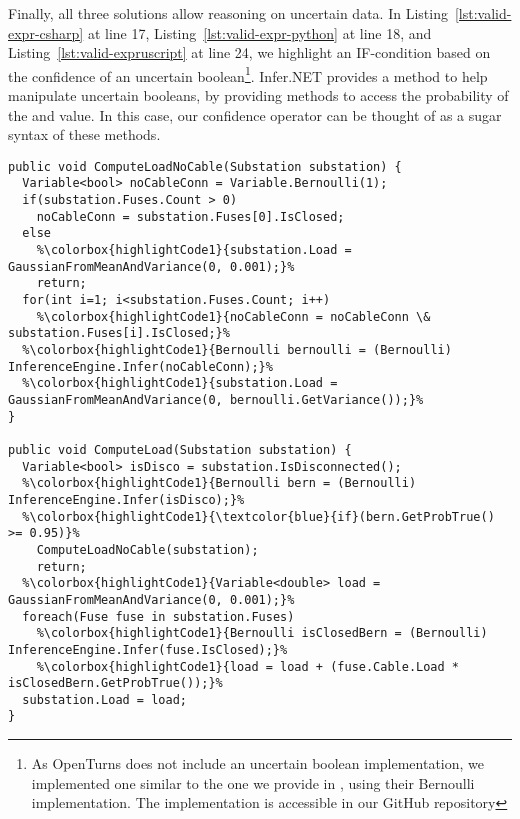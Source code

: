 Finally, all three solutions allow reasoning on uncertain data.
In Listing~\ref{lst:valid-expr-csharp} at line 17, Listing~\ref{lst:valid-expr-python} at line 18, and Listing~\ref{lst:valid-expruscript} at line 24, we highlight an IF-condition based on the confidence of an uncertain boolean\footnote{As OpenTurns does not include an uncertain boolean implementation, we implemented one similar to the one we provide in \languageName{}, using their Bernoulli implementation. The implementation is  accessible in our GitHub repository}.
Infer.NET provides a method to help manipulate uncertain booleans, by providing methods to access the probability of the \true{} and \false{} value.
In this case, our confidence operator can be thought of as a sugar syntax of these methods.

\begin{lstlisting}[style=cSharpStyle, caption={Excerpt of the Infer.NET implementation (C\#)}, label=lst:valid-expr-csharp, linewidth=0.97\textwidth, escapechar=\%]
public void ComputeLoadNoCable(Substation substation) {
  Variable<bool> noCableConn = Variable.Bernoulli(1);
  if(substation.Fuses.Count > 0)
    noCableConn = substation.Fuses[0].IsClosed;
  else
    %\colorbox{highlightCode1}{substation.Load = GaussianFromMeanAndVariance(0, 0.001);}%
    return;
  for(int i=1; i<substation.Fuses.Count; i++)
    %\colorbox{highlightCode1}{noCableConn = noCableConn \& substation.Fuses[i].IsClosed;}%
  %\colorbox{highlightCode1}{Bernoulli bernoulli = (Bernoulli) InferenceEngine.Infer(noCableConn);}%
  %\colorbox{highlightCode1}{substation.Load = GaussianFromMeanAndVariance(0, bernoulli.GetVariance());}%
}

public void ComputeLoad(Substation substation) {
  Variable<bool> isDisco = substation.IsDisconnected();
  %\colorbox{highlightCode1}{Bernoulli bern = (Bernoulli) InferenceEngine.Infer(isDisco);}%
  %\colorbox{highlightCode1}{\textcolor{blue}{if}(bern.GetProbTrue() >= 0.95)}%
    ComputeLoadNoCable(substation);
    return;
  %\colorbox{highlightCode1}{Variable<double> load = GaussianFromMeanAndVariance(0, 0.001);}%
  foreach(Fuse fuse in substation.Fuses)
    %\colorbox{highlightCode1}{Bernoulli isClosedBern = (Bernoulli) InferenceEngine.Infer(fuse.IsClosed);}%                         
    %\colorbox{highlightCode1}{load = load + (fuse.Cable.Load * isClosedBern.GetProbTrue());}%
  substation.Load = load;
}
\end{lstlisting}

